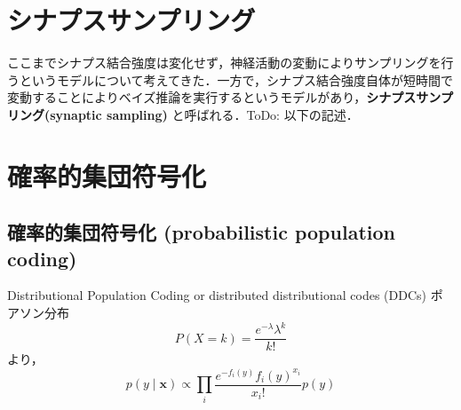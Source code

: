 \section{シナプスサンプリング}
ここまでシナプス結合強度は変化せず，神経活動の変動によりサンプリングを行うというモデルについて考えてきた．一方で，シナプス結合強度自体が短時間で変動することによりベイズ推論を実行するというモデルがあり，\textbf{シナプスサンプリング(synaptic sampling)} と呼ばれる．ToDo: 以下の記述．\citep{Kappel2015-kq}\citep{Aitchison2021-wo}
\section{確率的集団符号化}
\subsection{確率的集団符号化 (probabilistic population coding)}
Distributional Population Coding or distributed distributional codes (DDCs)
ポアソン分布
\begin{equation}
P(X=k)={\frac  {e^{-\lambda} \lambda^k}{k!}}
\end{equation}
より，
\begin{equation}
p(y \mid \mathbf{x}) \propto \prod_{i} \frac{e^{-f_{i}(y)} f_{i}(y)^{x_{i}}}{x_{i} !} p(y)
\end{equation}
